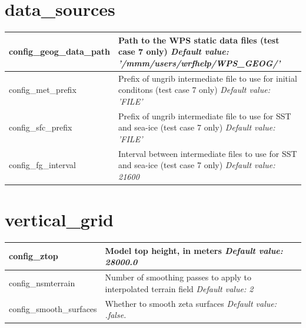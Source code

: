 \documentclass[11pt]{report}
\begin{document}
\section{data\_sources}

{\small
\begin{longtable}{|p{1.5in} |p{4.75in}|}
 \hline
   config\_geog\_data\_path  & Path to the WPS static data files (test case 7 only) \newline 
   {\em Default value: '/mmm/users/wrfhelp/WPS\_GEOG/'} \\ \hline
  
   config\_met\_prefix      & Prefix of ungrib intermediate file to use for initial conditons (test case 7 only) \newline 
   {\em Default value: 'FILE'} \\ \hline

   config\_sfc\_prefix      & Prefix of ungrib intermediate file to use for SST and sea-ice (test case 7 only) \newline 
   {\em Default value: 'FILE'} \\ \hline

   config\_fg\_interval     & Interval between intermediate files to use for SST and sea-ice (test case 7 only) \newline 
   {\em Default value: 21600} \\ \hline
\end{longtable}
}

\section{vertical\_grid}

{\small
\begin{longtable}{|p{1.75in} |p{4.5in}|}
 \hline
   config\_ztop            & Model top height, in meters \newline 
   {\em Default value: 28000.0} \\ \hline
   
   config\_nsmterrain      & Number of smoothing passes to apply to interpolated terrain field \newline 
   {\em Default value: 2} \\ \hline
   
   config\_smooth\_surfaces & Whether to smooth zeta surfaces \newline 
   {\em Default value: .false.} \\ \hline
\end{longtable}
}
\end{document}
